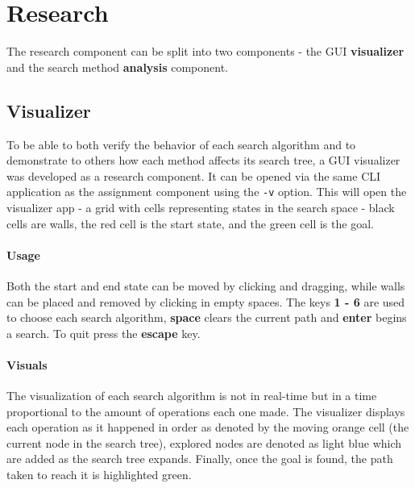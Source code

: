 \section{Research} %
\label{sec:research}
The research component can be split into two components - the GUI \textbf{visualizer} and the search method \textbf{analysis} component.

\subsection{Visualizer} %
\label{sub:visualizer}
To be able to both verify the behavior of each search algorithm and to demonstrate to others how each method affects its search tree, a GUI visualizer was developed as a research component. It can be opened via the same CLI application as the assignment component using the \texttt{-v} option. This will open the visualizer app - a grid with cells representing states in the search space - black cells are walls, the red cell is the start state, and the green cell is the goal.

\paragraph{Usage} %
\label{par:usage}
Both the start and end state can be moved by clicking and dragging, while walls can be placed and removed by clicking in empty spaces. The keys \textbf{1 - 6} are used to choose each search algorithm, \textbf{space} clears the current path and \textbf{enter} begins a search. To quit press the \textbf{escape} key.

\paragraph{Visuals} %
\label{par:visuals}
The visualization of each search algorithm is not in real-time but in a time proportional to the amount of operations each one made. The visualizer displays each operation as it happened in order as denoted by the moving orange cell (the current node in the search tree), explored nodes are denoted as light blue which are added as the search tree expands. Finally, once the goal is found, the path taken to reach it is highlighted green.

